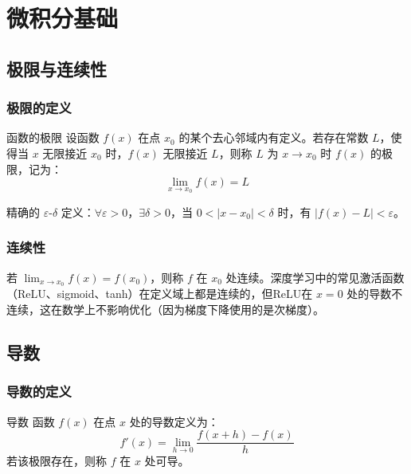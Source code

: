 \chapter{微积分基础}


\section{极限与连续性}

\subsection{极限的定义}

\begin{mydefinition}{函数的极限}
设函数 $f(x)$ 在点 $x_0$ 的某个去心邻域内有定义。若存在常数 $L$，使得当 $x$ 无限接近 $x_0$ 时，$f(x)$ 无限接近 $L$，则称 $L$ 为 $x\to x_0$ 时 $f(x)$ 的极限，记为：
\[
\lim_{x\to x_0} f(x) = L
\]
\end{mydefinition}

精确的 $\varepsilon$-$\delta$ 定义：$\forall\varepsilon>0$，$\exists\delta>0$，当 $0<|x-x_0|<\delta$ 时，有 $|f(x)-L|<\varepsilon$。

\subsection{连续性}

若 $\lim_{x\to x_0}f(x)=f(x_0)$，则称 $f$ 在 $x_0$ 处连续。深度学习中的常见激活函数（ReLU、sigmoid、tanh）在定义域上都是连续的，但ReLU在 $x=0$ 处的导数不连续，这在数学上不影响优化（因为梯度下降使用的是次梯度）。

\section{导数}

\subsection{导数的定义}

\begin{mydefinition}{导数}
函数 $f(x)$ 在点 $x$ 处的导数定义为：
\[
f'(x) = \lim_{h\to 0} \frac{f(x+h)-f(x)}{h}
\]
若该极限存在，则称 $f$ 在 $x$ 处可导。
\end{mydefinition}

